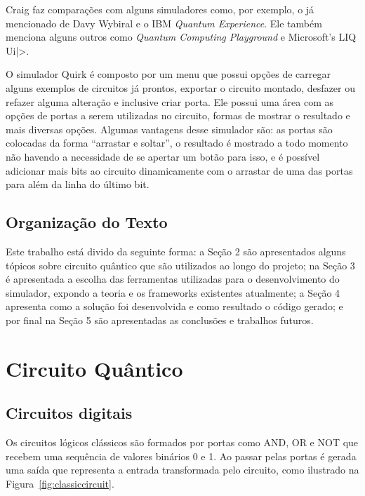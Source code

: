 \documentclass[a4paper, 12pt, oneside]{book}
\begin{document}
Craig faz comparações com alguns simuladores como, por exemplo, o já mencionado de Davy Wybiral e o IBM \textit{Quantum Experience}. Ele também menciona alguns outros como \textit{Quantum Computing Playground} e Microsoft's LIQ Ui|>.

O simulador Quirk é composto por um menu que possui opções de carregar alguns exemplos de circuitos já prontos, exportar o circuito montado, desfazer ou refazer alguma alteração e inclusive criar porta. Ele possui uma área com as opções de portas a serem utilizadas no circuito, formas de mostrar o resultado e mais diversas opções. Algumas vantagens desse simulador são: as portas são colocadas da forma ``arrastar e soltar'', o resultado é mostrado a todo momento não havendo a necessidade de se apertar um botão para isso, e é possível adicionar mais bits ao circuito dinamicamente com o arrastar de uma das portas para além da linha do último bit.

\section{Organização do Texto}

Este trabalho está divido da seguinte forma: a Seção 2 são apresentados alguns tópicos sobre circuito quântico que são utilizados ao longo do projeto; na Seção 3 é apresentada a escolha das ferramentas utilizadas para o desenvolvimento do simulador, expondo a teoria e os frameworks existentes atualmente; a Seção 4 apresenta como a solução foi desenvolvida e como resultado o código gerado; e por final na Seção 5 são apresentadas as conclusões e trabalhos futuros.

\chapter{Circuito Quântico}

\section{Circuitos digitais}
Os circuitos lógicos clássicos são formados por portas como AND, OR e NOT que recebem uma sequência de valores binários 0 e 1. Ao passar pelas portas é gerada uma saída que representa a entrada transformada pelo circuito, como ilustrado na Figura~\ref{fig:classiccircuit}.
\end{document}

